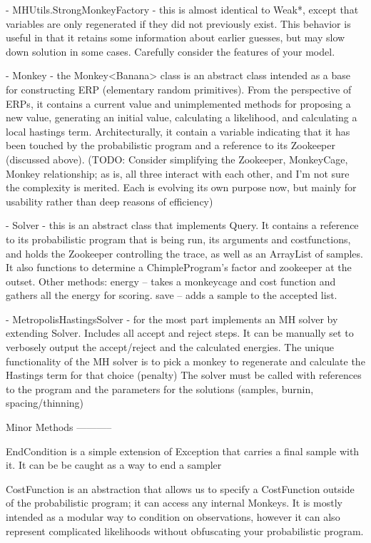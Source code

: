 - MHUtils.StrongMonkeyFactory - this is almost identical to Weak*, except that variables are only regenerated if they did not previously exist. This behavior is useful in that it retains some information about earlier guesses, but may slow down solution in some cases. Carefully consider the features of your model.

- Monkey - the Monkey<Banana> class is an abstract class intended as a base for constructing ERP (elementary random primitives). From the perspective of ERPs, it contains a current value and unimplemented methods for proposing a new value, generating an initial value, calculating a likelihood, and calculating a local hastings term. Architecturally, it contain a variable indicating that it has been touched by the probabilistic program and a reference to its Zookeeper (discussed above). (TODO: Consider simplifying the Zookeeper, MonkeyCage, Monkey relationship; as is, all three interact with each other, and I'm not sure the complexity is merited. Each is evolving its own purpose now, but mainly for usability rather than deep reasons of efficiency)

- Solver - this is an abstract class that implements Query. It contains a reference to its probabilistic program that is being run, its arguments and costfunctions, and holds the Zookeeper controlling the trace, as well as an ArrayList of samples. It also functions to determine a ChimpleProgram's factor and zookeeper at the outset.
Other methods: energy -- takes a monkeycage and cost function and gathers all the energy for scoring. save -- adds a sample to the accepted list.

- MetropolisHastingsSolver - for the most part implements an MH solver by extending Solver. Includes all accept and reject steps. It can be manually set to verbosely output the accept/reject and the calculated energies. The unique functionality of the MH solver is to pick a monkey to regenerate and calculate the Hastings term for that choice (penalty) The solver must be called with references to the program and the parameters for the solutions (samples, burnin, spacing/thinning)





Minor Methods
-----------

EndCondition is a simple extension of Exception that carries a final sample with it. It can be be caught as a way to end a sampler

CostFunction is an abstraction that allows us to specify a CostFunction outside of the probabilistic program; it can access any internal Monkeys. It is mostly intended as a modular way to condition on observations, however it can also represent complicated likelihoods without obfuscating your probabilistic program.

